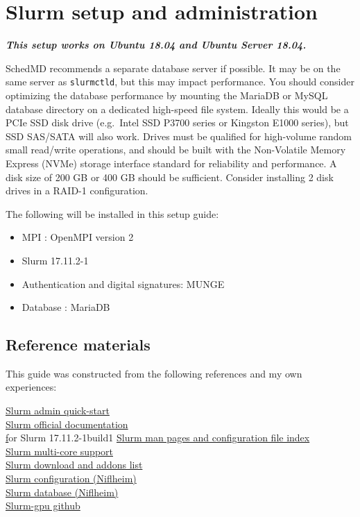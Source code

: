 \chapter{Slurm setup and administration} \label{ch:slurmsetup}

\textbf{\emph{This setup works on Ubuntu 18.04 and Ubuntu Server 18.04.}}

SchedMD recommends a separate database server if possible. It may be on the same server as \texttt{slurmctld}, but this may impact performance. You should consider optimizing the database performance by mounting the MariaDB or MySQL database directory on a dedicated high-speed file system. Ideally this would be a PCIe SSD disk drive (e.g.\ Intel SSD P3700 series or Kingston E1000 series), but SSD SAS/SATA will also work. Drives must be qualified for high-volume random small read/write operations, and should be built with the Non-Volatile Memory Express (NVMe) storage interface standard for reliability and performance. A disk size of 200 GB or 400 GB should be sufficient. Consider installing 2 disk drives in a RAID-1 configuration.

The following will be installed in this setup guide:

\begin{itemize}
\item MPI : OpenMPI version 2
\item Slurm 17.11.2-1
\item Authentication and digital signatures: MUNGE
\item Database : MariaDB
\end{itemize}

\section{Reference materials} \label{sec:slurmguides}

This guide was constructed from the following references and my own experiences:

\href{https://slurm.schedmd.com/quickstart_admin.html}{Slurm admin quick-start} \\
\indent \href{https://slurm.schedmd.com/documentation.html}{Slurm official documentation} \\
\indent \href{slurm-wlm-doc} for Slurm 17.11.2-1build1
\indent \href{https://slurm.schedmd.com/man_index.html}{Slurm man pages and configuration file index} \\
\indent \href{https://slurm.schedmd.com/mc_support.html}{Slurm multi-core support} \\
\indent \href{https://slurm.schedmd.com/download.html}{Slurm download and addons list} \\
\indent \href{https://wiki.fysik.dtu.dk/niflheim/Slurm_configuration}{Slurm configuration (Niflheim)} \\
\indent \href{https://wiki.fysik.dtu.dk/niflheim/Slurm_database}{Slurm database (Niflheim)} \\
\indent \href{https://github.com/dholt/slurm-gpu}{Slurm-gpu github}

